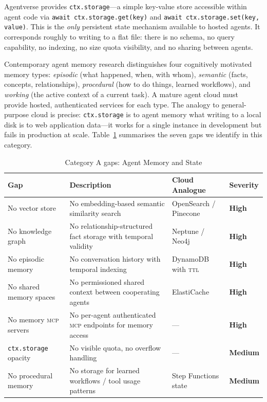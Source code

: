 \documentclass[twoside,11pt]{article}
\newcommand{\high}{\textcolor{red!70!black}{\textbf{High}}}
\newcommand{\medium}{\textcolor{orange!80!black}{\textbf{Medium}}}
\begin{document}
Agentverse provides \texttt{ctx.storage}---a simple key-value store accessible
within agent code via \texttt{await ctx.storage.get(key)} and
\texttt{await ctx.storage.set(key, value)}.  This is the \emph{only} persistent
state mechanism available to hosted agents.  It corresponds roughly to writing
to a flat file: there is no schema, no query capability, no indexing, no size
quota visibility, and no sharing between agents.

Contemporary agent memory research \citep{mem0blog2026,zepgraphiti2025,yang2026graphsurvey}
distinguishes four cognitively motivated memory types: \emph{episodic} (what
happened, when, with whom), \emph{semantic} (facts, concepts, relationships),
\emph{procedural} (how to do things, learned workflows), and \emph{working}
(the active context of a current task).  A mature agent cloud must provide
hosted, authenticated services for each type.  The analogy to general-purpose
cloud is precise: \texttt{ctx.storage} is to agent memory what writing to a
local disk is to web application data---it works for a single instance in
development but fails in production at scale.  Table~\ref{tab:gap-memory}
summarises the seven gaps we identify in this category.

\begin{table}[htbp]
\centering
\caption{Category A gaps: Agent Memory and State}
\label{tab:gap-memory}
\begin{tabular}{>{\raggedright\arraybackslash}p{3.2cm} >{\raggedright\arraybackslash}p{5.5cm} >{\raggedright\arraybackslash}p{2.9cm} l}
\toprule
\textbf{Gap} & \textbf{Description} & \textbf{Cloud Analogue} &
\textbf{Severity} \\
\midrule
No vector store & No embedding-based semantic similarity search & OpenSearch /
Pinecone & \high \\
No knowledge graph & No relationship-structured fact storage with temporal
validity & Neptune / Neo4j & \high \\
No episodic memory & No conversation history with temporal indexing & DynamoDB
with \textsc{ttl} & \high \\
No shared memory spaces & No permissioned shared context between cooperating
agents & ElastiCache & \high \\
No memory \textsc{mcp} servers & No per-agent authenticated \textsc{mcp}
endpoints for memory access & --- & \high \\
\texttt{ctx.storage} opacity & No visible quota, no overflow handling & --- &
\medium \\
No procedural memory & No storage for learned workflows / tool usage patterns &
Step Functions state & \medium \\
\bottomrule
\end{tabular}
\end{table}
\end{document}

